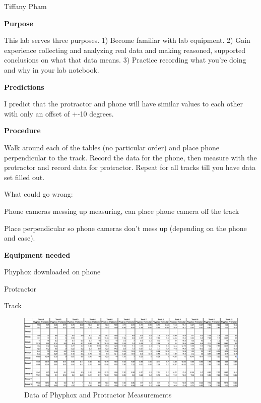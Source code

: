 \documentclass[idxtotoc,hyperref,openany]{labbook} %
\begin{document}

\vspace{-5mm}
Tiffany Pham

\vspace{-5mm}
\textbf{Purpose}

This lab serves three purposes. 1) Become familiar with lab equipment. 2) Gain experience
collecting and analyzing real data and making reasoned, supported conclusions on what that data
means. 3) Practice recording what you’re doing and why in your lab notebook.

\hfill \break
\textbf{Predictions}

I predict that the protractor and phone will have similar values to each other with only an offset of +-10 degrees.

\hfill \break
\textbf{Procedure}

Walk around each of the tables (no particular order) and place phone perpendicular to the track. Record the data for the phone, then measure with the protractor and record data for protractor. Repeat for all tracks till you have data set filled out.

\hfill \break 
What could go wrong:

Phone cameras messing up measuring, can place phone camera off the track

Place perpendicular so phone cameras don't mess up (depending on the phone and case).

\hfill \break
\textbf{Equipment needed}

Phyphox downloaded on phone

Protractor

Track




\begin{figure}[H] %
\begin{center}
\includegraphics[width=1.25\linewidth]{images/Lab.01/PhyphoxProtractorSpreadsheet.png}
\end{center}
\caption{Data of Phyphox and Protractor Measurements}
\label{fig:Data of Phyphox and Protractor Measurements}
\end{figure}
\end{document}

